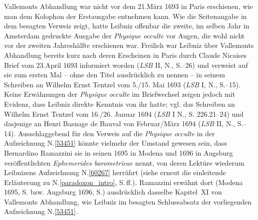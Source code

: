 Vallemonts Abhandlung war nicht vor dem 21.\;März 1693 in Paris erschienen, wie man dem Kolophon der Erstausgabe entnehmen kann.
Wie die Seitenangabe in dem besagten Verweis zeigt, hatte Leibniz offenbar die zweite, im selben Jahr in Amsterdam gedruckte Ausgabe der \textit{Physique occulte}\cite{01513} vor Augen, die wohl nicht vor der zweiten Jahreshälfte erschienen war.
Freilich war Leibniz über Vallemonts Abhandlung bereits kurz nach deren Erscheinen in Paris durch Claude Nicaises Brief vom 23.\;April 1693 informiert worden (\textit{LSB} II, N., S.--26)\cite{02518} und verweist auf sie zum ersten Mal -- ohne den Titel ausdrücklich zu nennen -- in seinem Schreiben an Wilhelm Ernst Tentzel vom 5./15. Mai 1693 (\textit{LSB} I, N., S.--15).\cite{01467}
Keine Erwähnungen der \textit{Physique occulte}\cite{01513} im Briefwechsel zeigen jedoch mit Evidenz, dass Leibniz direkte Kenntnis von ihr hatte; vgl. das Schreiben an Wilhelm Ernst Tentzel vom 16./26. Januar 1694 (\textit{LSB} I N., S. 226.21--24)\cite{01468}
und dasjenige an Henri Basnage de Bauval von Februar/März 1694 (\textit{LSB} II, N., S.--14).\cite{01469}
Ausschlaggebend für den Verweis auf die \textit{Physique occulte}\cite{01513} in der Aufzeichnung N.\;\ref{53451} könnte vielmehr der Umstand gewesen sein, dass Bernardino Ramazzini sie in seinen 1695 in Modena\cite{01516} und 1696 in Augsburg\cite{01517} veröffentlichten \textit{Ephemerides barometricae} nennt, von deren Lektüre wiederum Leibnizens Aufzeichnung N.\;\ref{60267} herrührt (siehe erneut die einleitende Erläuterung zu N.\;\ref{paradoxon_intro}, S.\;\pageref{paradoxonbarometricum_intro}\,ff.).
Ramazzini erwähnt dort (Modena 1695, S.\cite{01516} bzw. Augsburg 1696, S.)\cite{01517} ausdrücklich dasselbe Kapitel~XI von Vallemonts Abhandlung, wie Leibniz im besagten Schlussabsatz der vorliegenden Aufzeichnung N.\;\ref{53451}.
